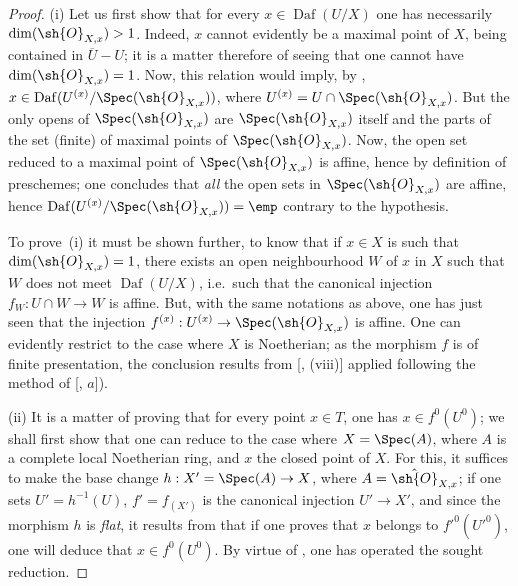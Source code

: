 \begin{proof}
(i) Let us first show that for every $x\in\operatorname{Daf}(U/X)$ one has necessarily $\dim(\sh{O}_{X,x})>1$.
Indeed, $x$ cannot evidently be a maximal point of $X$, being contained in $\overline{U}-U$;
it is a matter therefore of seeing that one cannot have $\dim(\sh{O}_{X,x})=1$.
Now, this relation would imply, by , $x\in\operatorname{Daf}(U^{(x)}/\Spec(\sh{O}_{X,x}))$, where $U^{(x)}=U\cap\Spec(\sh{O}_{X,x})$.
But the only opens of $\Spec(\sh{O}_{X,x})$ are $\Spec(\sh{O}_{X,x})$ itself and the parts of the set (finite) of maximal points of $\Spec(\sh{O}_{X,x})$.
Now, the open set reduced to a maximal point of $\Spec(\sh{O}_{X,x})$ is affine, hence by definition of preschemes;
one concludes that \emph{all} the open sets in $\Spec(\sh{O}_{X,x})$ are affine, hence $\operatorname{Daf}(U^{(x)}/\Spec(\sh{O}_{X,x}))=\emp$ contrary to the hypothesis.

To prove~(i) it must be shown further, to know that if $x\in X$ is such that $\dim(\sh{O}_{X,x})=1$, there exists an open neighbourhood $W$ of $x$ in $X$ such that $W$ does not meet $\operatorname{Daf}(U/X)$, i.e.\ such that the canonical injection $f_W:U\cap W\to W$ is affine.
But, with the same notations as above, one has just seen that the injection $f^{(x)}:U^{(x)}\to\Spec(\sh{O}_{X,x})$ is affine.
One can evidently restrict to the case where $X$ is Noetherian;
as the morphism $f$ is of finite presentation, the conclusion results from [, (viii)] applied following the method of [, $a$]).

(ii) It is a matter of proving that for every point $x\in T$, one has $x\in f^0(U^0)$;
we shall first show that one can reduce to the case where $X=\Spec(A)$, where $A$ is a complete local Noetherian ring, and $x$ the closed point of $X$.
For this, it suffices to make the base change $h:X'=\Spec(A)\to X$, where $A=\hat{\sh{O}}_{X,x}$;
if one sets $U'=h^{-1}(U)$, $f'=f_{(X')}$ is the canonical injection $U'\to X'$, and since the morphism $h$ is \emph{flat}, it results from  that if one proves that $x$ belongs to $f'^0(U'^0)$, one will deduce that $x\in f^0(U^0)$.
By virtue of , one has operated the sought reduction.



\end{proof}
